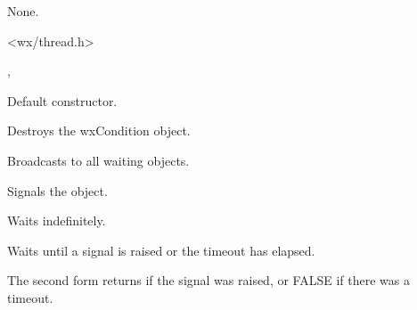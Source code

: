 
None.


<wx/thread.h>


, 


\label{wxconditionconstr}


Default constructor.



Destroys the wxCondition object.

\label{wxconditionbroadcast}


Broadcasts to all waiting objects.

\label{wxconditionsignal}


Signals the object.

\label{wxconditionwait}


Waits indefinitely.


Waits until a signal is raised or the timeout has elapsed.





The second form returns if the signal was raised, or FALSE if there was a timeout.

